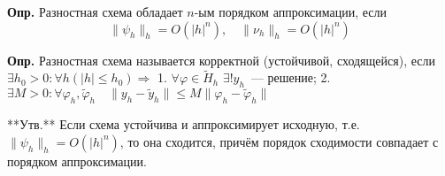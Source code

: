 \textbf{Опр.} Разностная схема обладает $n$-ым порядком аппроксимации, если
$$
    \| \psi_h \|_h = O(|h|^n),\quad \| \nu_h \|_h = O(|h|^n)
$$

\textbf{Опр.} Разностная схема называется корректной (устойчивой, сходящейся), если
$\exists h_0 > 0 : \forall h (|h| \leqslant h_0) \Rightarrow$
1. $\forall \varphi \in \tilde{H}_h \,\, \exists ! y_h$~--- решение;
2. $\exists M > 0 : \forall \varphi_h, \tilde{\varphi}_h \quad \| y_h - \tilde{y}_h \| \leqslant M \| \varphi_h - \tilde{\varphi}_h \|$

**Утв.** Если схема устойчива и аппроксимирует исходную, т.е. $\| \psi_h \|_h = O(|h|^n)$, то она сходится, причём порядок сходимости совпадает с порядком аппроксимации.